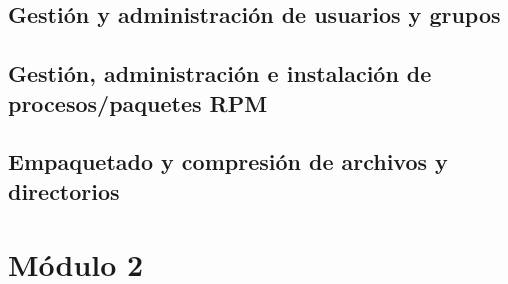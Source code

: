 \documentclass{beamer}
\begin{document}
\subsection{Gestión y administración de usuarios y grupos}
\subsection{Gestión, administración e instalación de procesos/paquetes RPM}
\subsection{Empaquetado y compresión de archivos y directorios}
\section{Módulo 2}






\end{document}
